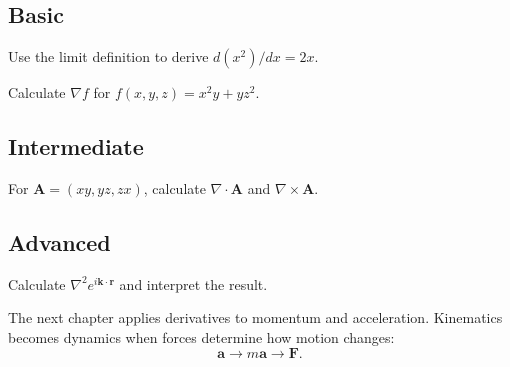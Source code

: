 \chapterexercisesheading
\subsection*{Basic}
\begin{chapterexercise}
Use the limit definition to derive $d(x^2)/dx=2x$.
\end{chapterexercise}

\begin{chapterexercise}[Gradient]
Calculate $\nabla f$ for $f(x,y,z)=x^2y+yz^2$.
\end{chapterexercise}

\subsection*{Intermediate}
\begin{chapterexercise}
For $\mathbf A=(xy,yz,zx)$, calculate
$\nabla\cdot\mathbf A$ and $\nabla\times\mathbf A$.
\end{chapterexercise}

\subsection*{Advanced}
\begin{chapterexercise}
Calculate $\nabla^2 e^{i\mathbf k\cdot\mathbf r}$ and interpret the result.
\end{chapterexercise}

\chapterlookaheadheading
\begin{lookingaheadbox}
The next chapter applies derivatives to momentum and acceleration. Kinematics
becomes dynamics when forces determine how motion changes:
\[
\mathbf a
\longrightarrow
m\mathbf a
\longrightarrow
\mathbf F.
\]
\end{lookingaheadbox}
